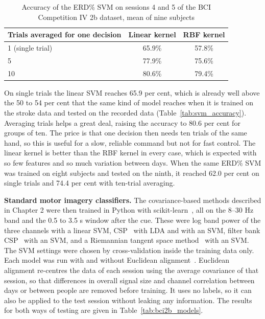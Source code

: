 \begin{table}[!htbp]
\centering
\caption{Accuracy of the ERD\% SVM on sessions 4 and 5 of the BCI Competition IV 2b dataset, mean of nine subjects}
\label{tab:bci2b_erdsvm}
\begin{tabular}{|l|c|c|}
\hline
\textbf{Trials averaged for one decision} & \textbf{Linear kernel} & \textbf{RBF kernel} \\
\hline
1 (single trial) & 65.9\% & 57.8\% \\
\hline
5 & 77.9\% & 75.6\% \\
\hline
10 & 80.6\% & 79.4\% \\
\hline
\end{tabular}
\end{table}

On single trials the linear SVM reaches 65.9 per cent, which is already well above the 50
to 54 per cent that the same kind of model reaches when it is trained on the stroke data
and tested on the recorded data (Table~\ref{tab:svm_accuracy}). Averaging trials helps a great deal, raising
the accuracy to 80.6 per cent for groups of ten. The price is that one decision then needs
ten trials of the same hand, so this is useful for a slow, reliable command but not for
fast control. The linear kernel is better than the RBF kernel in every case, which is
expected with so few features and so much variation between days. When the same ERD\% SVM
was trained on eight subjects and tested on the ninth, it reached 62.0 per cent on single
trials and 74.4 per cent with ten-trial averaging.

\textbf{Standard motor imagery classifiers.} The covariance-based methods described in
Chapter 2 were then trained in Python with scikit-learn~\cite{pedregosa2011sklearn}, all on
the 8--30 Hz band and the 0.5 to 3.5 s window after the cue. These were log band power of
the three channels with a linear SVM, CSP~\cite{ramoser2000csp} with LDA and with an SVM,
filter bank CSP~\cite{ang2012fbcsp} with an SVM, and a Riemannian tangent space
method~\cite{barachant2012riemann} with an SVM. The SVM settings were chosen by
cross-validation inside the training data only. Each model was run with and without
Euclidean alignment~\cite{he2020ea}. Euclidean alignment re-centres the data of each
session using the average covariance of that session, so that differences in overall
signal size and channel correlation between days or between people are removed before
training. It uses no labels, so it can also be applied to the test session without
leaking any information. The results for both ways of testing are given in
Table~\ref{tab:bci2b_models}.

